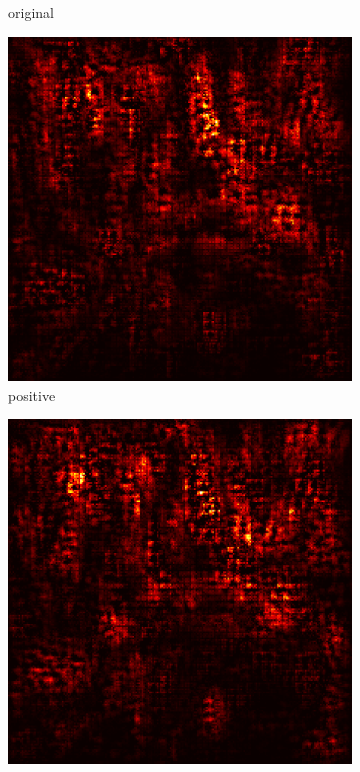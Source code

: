 \documentclass[preprint,12pt]{elsarticle}
\begin{document}
\begin{figure}
\begin{subfigure}{0.14\linewidth}
        \caption{original}
    \end{subfigure}
    \hfill
    \begin{subfigure}{0.14\textwidth}
        \centering
        \includegraphics[width=\linewidth]{../visualizations/examples/imagenette/cnn/positive_saliency_map/1.png}
        \caption{positive}
    \end{subfigure}
    \hfill
    \begin{subfigure}{0.14\textwidth}
        \centering
        \includegraphics[width=\linewidth]{../visualizations/examples/imagenette/cnn/negative_saliency_map/1.png}

\end{subfigure}
\end{figure}
\end{document}
